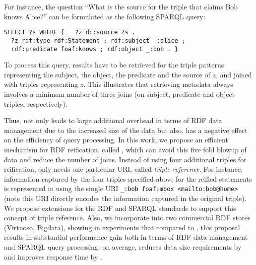 \begin{example}
For instance, the question ``What is the source for the triple that claims Bob knows Alice?'' can be formulated as the following SPARQL query:

\begin{footnotesize}%
	\begin{verbatim}
SELECT ?s WHERE {   ?z dc:source ?s .
  ?z rdf:type rdf:Statement ; rdf:subject _:alice ;
  rdf:predicate foaf:knows ; rdf:object _:bob . }

\end{verbatim}%
\end{footnotesize}
To process this query, results have to be retrieved for the triple patterns representing the subject, the object, the predicate and the source of $z$, and joined with triples representing $z$. This illustrates that retrieving metadata always involves a minimum number of three joins (on subject, predicate and object triples, respectively). 
\end{example}

Thus, {\Reifi} not only leads to large additional overhead in terms of RDF data management due to the increased size of the data but also, has a negative effect on the efficiency of query processing. In this work, we propose an efficient mechanism for RDF reification, called \emph{\ReifiPlus}, which can avoid this five fold blowup of data and reduce the number of joins. Instead of using four additional triples for reification, {\ReifiPlus} only needs one particular URI, called \emph{triple reference}. For instance, information captured by the four triples specified above for the reified statements is represented in {\ReifiPlus} using the single URI \verb+_:bob foaf:mbox <mailto:bob@home>+ (note this URI directly encodes the information captured in the original triple). We propose extensions for the RDF and SPARQL standards to support this concept of triple reference. Also, we incorporate {\ReifiPlus} into two commercial RDF stores (Virtuoso, Bigdata), showing in experiments that compared to {\Reifi}, this proposal results in substantial performance gain both in terms of RDF data management and SPARQL query processing: on average, {\ReifiPlus} reduces data size requirements by  and improves response time by .

%

